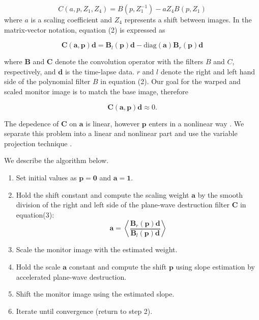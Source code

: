 \begin{equation}
C(a,p,Z_1,Z_4) = B(p,Z_1^{-1})-aZ_4B(p,Z_1)
\end{equation}
where $a$ is a scaling coefficient and $Z_4$ represents a shift between images. In the matrix-vector notation, equation (2) is expressed as

\begin{equation}
\mathbf{C}(\mathbf{a},\mathbf{p})\mathbf{d} = \mathbf{B}_l(\mathbf{p})\mathbf{d} -\mbox{diag}(\mathbf{a})\mathbf{B}_r(\mathbf{p})\mathbf{d}
\end{equation}

where $\mathbf{B}$ and $\mathbf{C}$ denote the convolution operator with the filters $B$ and $C$, respectively, and $\mathbf{d}$ is the time-lapse data. $r$ and $l$ denote the right and left hand side of the polynomial filter $B$ in equation (2). 
Our goal for the warped and scaled monitor image is to match the base image, therefore 

\begin{equation}
\mathbf{C}(\mathbf{a},\mathbf{p})\mathbf{d}\approx 0 .
\end{equation}

The depedence of $\mathbf{C}$ on $\mathbf{a}$ is linear, however $\mathbf{p}$ 
enters in a nonlinear way \cite[]{chena}. We separate this problem into a 
linear and nonlinear part and use the variable projection technique 
\cite[]{golub,kaufman}.

We describe the algorithm below.

\begin{enumerate}
\item Set initial values as $\mathbf{p} = \mathbf{0}$ and $\mathbf{a} = \mathbf{1}$.
\item Hold the shift constant and compute the scaling weight $\mathbf{a}$ by the smooth division of the right and left side of the plane-wave destruction filter $\mathbf{C}$ in equation(3): 
\begin{equation}
\mathbf{a} = \left<\frac{\mathbf{B}_r(\mathbf{p})\mathbf{d}}{\mathbf{B}_l(\mathbf{p})\mathbf{d}}\right>
\end{equation}
\item Scale the monitor image with the estimated weight.
\item Hold the scale $\mathbf{a}$ constant and compute the shift $\mathbf{p}$ using slope estimation by accelerated plane-wave destruction.
\item Shift the monitor image using the estimated slope.
\item Iterate until convergence (return to step 2).
\end{enumerate}

